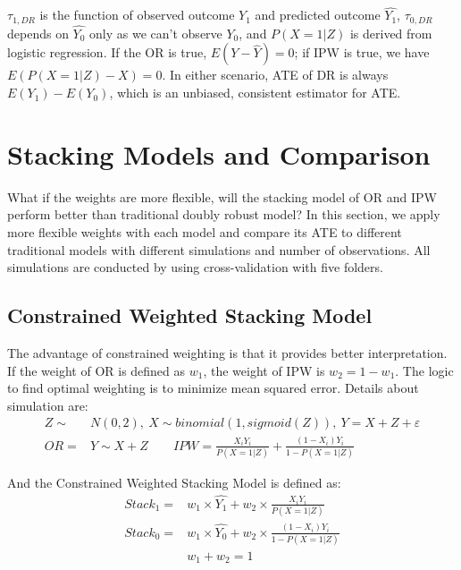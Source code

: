 \documentclass{elegantpaper}
\begin{document}
\smallskip
$\tau_{1,D R}$ is the function of observed outcome $Y_1$ and predicted outcome $\widehat{Y_1}$, $\tau_{0,D R}$ depends on $\widehat{Y_0}$ only as we can't observe $Y_0$, and  $P(X=1| Z)$ is derived from logistic regression. If the OR is true, $E(Y-\hat{Y})=0$; if IPW is true, we have $E(P(X=1 | Z)-X)=0$. In either scenario, ATE of DR is always $E(Y_1)-E(Y_0)$, which is an unbiased, consistent estimator for ATE.


\section{Stacking Models and Comparison}
What if the weights are more flexible, will the stacking model of OR and IPW perform better than traditional doubly robust model? In this section, we apply more flexible weights with each model and compare its ATE to different traditional models with different simulations and number of observations. All simulations are conducted by using cross-validation with five folders.

\subsection{Constrained Weighted Stacking Model}
The advantage of constrained weighting is that it provides better interpretation. If the weight of OR is defined as $w_1$, the weight of IPW is $w_2 = 1 - w_1$. The logic to find optimal weighting is to minimize mean squared error. Details about simulation are:
\begin{equation}
\begin{split}
Z \sim&N(0,2), \ X \sim binomial(1,sigmoid(Z)), \ Y = X + Z + \varepsilon \\
OR =&Y \sim X+Z \quad\quad
IPW= \frac{X_{i} Y_{i}}{P(X=1 | Z)} + \frac{\left(1-X_{i}\right) Y_{i}}{1-P(X=1 | Z)}\
\end{split}
\end{equation}

And the Constrained Weighted Stacking Model is defined as:
\begin{equation}
\begin{split}
Stack_{1} =&w_1 \times \widehat{Y_1} + w_2 \times \frac{X_{i} Y_{i}}{P(X=1 | Z)}\\
Stack_{0} =&w_1 \times \widehat{Y_0} + w_2 \times \frac{\left(1-X_{i}\right) Y_{i}}{1-P(X=1 | Z)}\\
&w_1 + w_2 = 1
\end{split}
\end{equation}
\end{document}
